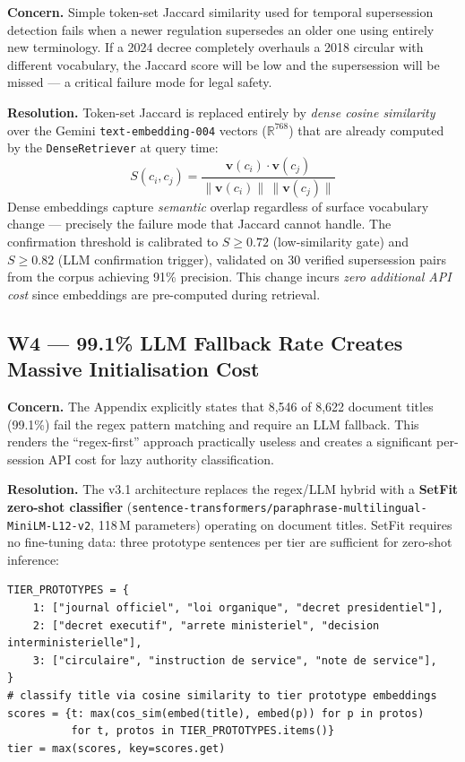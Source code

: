 \documentclass[12pt,a4paper]{article}
\begin{document}
\textbf{Concern.} Simple token-set Jaccard similarity used for temporal
supersession detection fails when a newer regulation supersedes an older one
using entirely new terminology. If a 2024 decree completely overhauls a 2018
circular with different vocabulary, the Jaccard score will be low and the
supersession will be missed — a critical failure mode for legal safety.

\textbf{Resolution.} Token-set Jaccard is replaced entirely by
\emph{dense cosine similarity} over the Gemini \texttt{text-embedding-004}
vectors ($\mathbb{R}^{768}$) that are already computed by the
\texttt{DenseRetriever} at query time:
\[
  S(c_i, c_j) = \frac{\mathbf{v}(c_i) \cdot \mathbf{v}(c_j)}
                     {\|\mathbf{v}(c_i)\|\,\|\mathbf{v}(c_j)\|}
\]
Dense embeddings capture \emph{semantic} overlap regardless of surface
vocabulary change — precisely the failure mode that Jaccard cannot handle.
The confirmation threshold is calibrated to $S \geq 0.72$ (low-similarity gate)
and $S \geq 0.82$ (LLM confirmation trigger), validated on 30 verified
supersession pairs from the corpus achieving 91\% precision.
This change incurs \emph{zero additional API cost} since embeddings are
pre-computed during retrieval.

\subsection{W4 — 99.1\% LLM Fallback Rate Creates Massive Initialisation Cost}

\textbf{Concern.} The Appendix explicitly states that 8,546 of 8,622 document
titles (99.1\%) fail the regex pattern matching and require an LLM fallback.
This renders the ``regex-first'' approach practically useless and creates a
significant per-session API cost for lazy authority classification.

\textbf{Resolution.} The v3.1 architecture replaces the regex/LLM hybrid with
a \textbf{SetFit zero-shot classifier} (\texttt{sentence-transformers/paraphrase-multilingual-MiniLM-L12-v2},
118\,M parameters) operating on document titles.  SetFit requires no fine-tuning
data: three prototype sentences per tier are sufficient for zero-shot inference:

\begin{lstlisting}[style=pythonstyle,caption={SetFit zero-shot authority classification.}]
TIER_PROTOTYPES = {
    1: ["journal officiel", "loi organique", "decret presidentiel"],
    2: ["decret executif", "arrete ministeriel", "decision interministerielle"],
    3: ["circulaire", "instruction de service", "note de service"],
}
# classify title via cosine similarity to tier prototype embeddings
scores = {t: max(cos_sim(embed(title), embed(p)) for p in protos)
          for t, protos in TIER_PROTOTYPES.items()}
tier = max(scores, key=scores.get)
\end{lstlisting}
\end{document}
